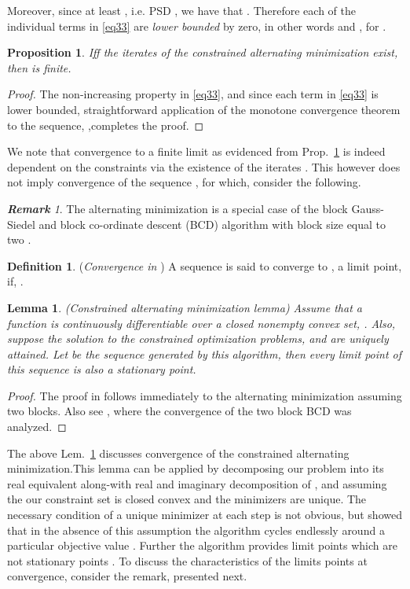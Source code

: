 \documentclass[11pt,draftclsnofoot,onecolumn]{IEEEtran}
\newtheorem{prop}{\bf{Proposition}}
\newtheorem{lem}{\bf {Lemma}}
\theoremstyle{definition}
\newtheorem{defn}{\bf Definition}
\theoremstyle{remark}
\newtheorem{remk}{\bf Remark}
\begin{document}
Moreover, since at least , i.e. PSD , we have that . Therefore each of the individual terms in \eqref{eq33} are {\it lower bounded} by zero, in other words  and , for  .
\begin{prop} \label{propos4}
Iff the iterates  of the constrained alternating minimization exist, then  is finite.
\end{prop}
\begin{proof}
The non-increasing property in \eqref{eq33}, and since each term in \eqref{eq33} is lower bounded, straightforward application of the monotone convergence  theorem to the sequence, ,completes the proof.
\end{proof}
We note that convergence to a finite limit as evidenced from Prop.~\ref{propos4} is indeed dependent on the constraints via the existence of the iterates . This however does not imply convergence of the sequence , for which, consider the following.
\begin{remk}\label{remark1}
The alternating minimization is a special case of the block Gauss-Siedel and block co-ordinate descent (BCD) algorithm with block size equal to two \cite{Grippo2000,Luo1992}.  
\end{remk}
\begin{defn} \label{deflimit} ({\it Convergence in }) A sequence  is said to converge to , a limit point, if, .
\end{defn}
\begin{lem} \label{altminlemma}
(Constrained alternating minimization lemma) Assume that a function  is continuously differentiable over a closed nonempty convex set, . Also, suppose the solution to the constrained optimization problems,  and  are uniquely attained. Let  be the sequence generated by this algorithm, then every limit point of this sequence is also a stationary point.
\end{lem}
\begin{proof}
The proof in \cite[Prop.~2.7.1]{Bertsekas1999} follows immediately to the alternating minimization assuming two blocks. Also see \cite{Grippo2000}, where the convergence of the two block BCD was analyzed. 
\end{proof}
The above Lem.~\ref{altminlemma} discusses convergence of the constrained alternating minimization.This lemma can be applied by decomposing our problem into its real equivalent along-with real and imaginary decomposition of , and assuming the our constraint set  is closed convex and the minimizers are unique. The necessary condition of a unique minimizer \cite{Zangwill1967} at each step is not obvious, but \cite{Powell1973} showed that in the absence of this assumption the algorithm cycles endlessly around a particular objective value \cite{Bertsekas1999}. Further the algorithm provides limit points which are not stationary points \cite{Grippo2000}. To discuss the characteristics of the limits points at convergence, consider the remark, presented next.
\end{document}
